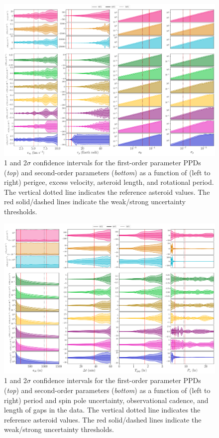 \documentclass[fleqn,usenatbib]{mnras}
\begin{document}
\begin{figure}
  \centering
  \includegraphics[angle=90, origin=c, width=0.99\linewidth]{figs/scan-all1.pdf}
  \caption{1 and 2$\sigma$ confidence intervals for the first-order parameter PPDs (\textit{top}) and second-order parameters (\textit{bottom}) as a function of (left to right) perigee, excess velocity, asteroid length, and rotational period. The vertical dotted line indicates the reference asteroid values. The red solid/dashed lines indicate the weak/strong uncertainty thresholds.}
  \label{fig:scan-perigee}
  \label{fig:scan-vex}
  \label{fig:scan-am}
  \label{fig:scan-period}
  \label{fig:scan-physical}
\end{figure}

\begin{figure}
  \centering
  \includegraphics[angle=90, origin=c, width=0.99\linewidth]{figs/scan-all2.pdf}
  \caption{1 and 2$\sigma$ confidence intervals for the first-order parameter PPDs (\textit{top}) and second-order parameters (\textit{bottom}) as a function of (left to right) period and spin pole uncertainty, observational cadence, and length of gaps in the data. The vertical dotted line indicates the reference asteroid values. The red solid/dashed lines indicate the weak/strong uncertainty thresholds.}
    \label{fig:scan-rho}
    \label{fig:scan-theta}
    \label{fig:scan-cadence}
    \label{fig:observation-gap}
    \label{fig:scan-observational}
\end{figure}
\end{document}

